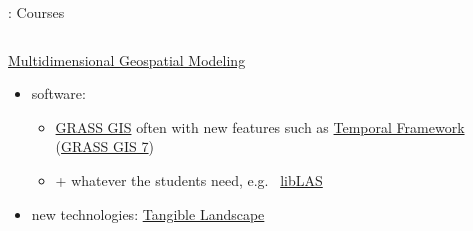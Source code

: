 \documentclass[xcolor={dvipsnames,usenames},beamer,aspectratio=169]{beamer}
\begin{document}
\begin{frame}{\geoforalllab: Courses}

\begin{columns}[c]


\begin{block}{\href{http://courses.ncsu.edu/mea592/common/}%
  {Multidimensional Geospatial Modeling}}

\begin{itemize}
 \item software:
 \begin{itemize}
   \item \href{http://grass.osgeo.org}{GRASS GIS}
   {\scriptsize
    often with new features such as
    \href{http://grass.osgeo.org/grass70/manuals/temporalintro.html}{Temporal Framework}
    (\href{http://grass.osgeo.org/grass7/}{GRASS GIS 7})
   }
  \item + whatever the students need, e.g.~%
    \href{http://www.liblas.org/}{libLAS}
 \end{itemize}

 \item new technologies:
   \href{http://geospatial.ncsu.edu/osgeorel/tangible-landscape.html}%
   {Tangible Landscape}

\end{itemize}

\end{block}



\end{columns}
\end{frame}
\end{document}
